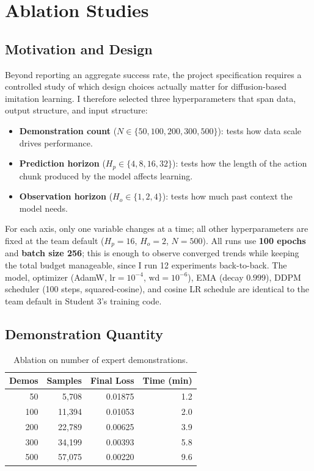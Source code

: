 \documentclass[11pt]{article}
\begin{document}
\section{Ablation Studies}

\subsection{Motivation and Design}

Beyond reporting an aggregate success rate, the project specification
requires a controlled study of which design choices actually matter
for diffusion-based imitation learning. I therefore selected three
hyperparameters that span data, output structure, and input structure:

\begin{itemize}
    \item \textbf{Demonstration count} ($N \in \{50, 100, 200, 300, 500\}$):
    tests how data scale drives performance.
    \item \textbf{Prediction horizon} ($H_p \in \{4, 8, 16, 32\}$):
    tests how the length of the action chunk produced by the model
    affects learning.
    \item \textbf{Observation horizon} ($H_o \in \{1, 2, 4\}$):
    tests how much past context the model needs.
\end{itemize}

For each axis, only one variable changes at a time; all other
hyperparameters are fixed at the team default ($H_p = 16$, $H_o = 2$,
$N = 500$). All runs use \textbf{100 epochs} and
\textbf{batch size 256}; this is enough to observe converged trends
while keeping the total budget manageable, since I run 12 experiments
back-to-back. The model, optimizer (AdamW, $\text{lr} = 10^{-4}$,
$\text{wd} = 10^{-6}$), EMA (decay $0.999$), DDPM scheduler (100
steps, squared-cosine), and cosine LR schedule are identical to the
team default in Student 3's training code.

\subsection{Demonstration Quantity}

\begin{table}[H]
\centering
\small
\begin{tabular}{rrrr}
\toprule
\textbf{Demos} & \textbf{Samples} & \textbf{Final Loss} & \textbf{Time (min)} \\
\midrule
50  & 5{,}708  & 0.01875 & 1.2 \\
100 & 11{,}394 & 0.01053 & 2.0 \\
200 & 22{,}789 & 0.00625 & 3.9 \\
300 & 34{,}199 & 0.00393 & 5.8 \\
500 & 57{,}075 & 0.00220 & 9.6 \\
\bottomrule
\end{tabular}
\caption{Ablation on number of expert demonstrations.}
\label{tab:demo_count}
\end{table}
\end{document}
